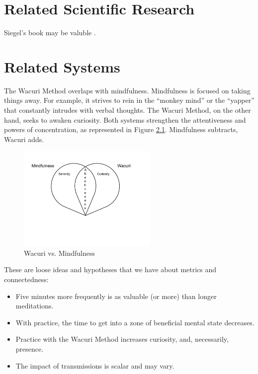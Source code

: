 \documentclass[12pt]{book}
\begin{document}
\chapter{Related Scientific Research}

Siegel's book may be valuble \cite{siegel2007mindful}.


\chapter{Related Systems}

The Wacuri Method overlaps with mindfulness.  Mindfulness is focused
on taking things away. For example, it strives to rein in the
``monkey mind'' or the ``yapper'' that constantly intrudes with
verbal thoughts. The Wacuri Method, on the other hand, seeks
to awaken curiosity. Both systems strengthen the attentiveness
and powers of concentration, as represented in Figure \ref{fig:wacurivsmindfulness}. Mindfulness subtracts, Wacuri adds.

\begin{figure}
  \centering
     \includegraphics[width=0.6\textwidth]{WacuriFigures/WacuriMindfulnessDiagram.png}
     \caption{Wacuri vs. Mindfulness}
  \label{fig:wacurivsmindfulness}     
\end{figure}

These are loose ideas and hypotheses that we have about metrics and connectedness:
\begin{itemize}
\item Five minutes more frequently is as valuable (or more) than longer meditations.
\item With practice, the time to get into a zone of beneficial mental state decreases.
\item Practice with the Wacuri Method increases curiosity, and, necessarily, presence.
  \item The impact of transmissions is scalar and may vary.
\end{itemize}
\end{document}
